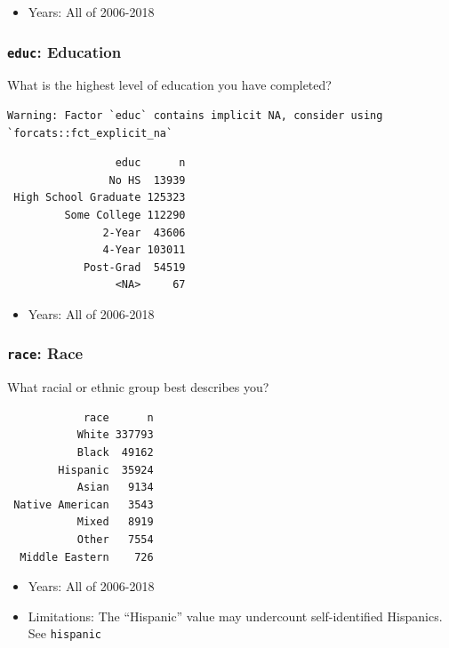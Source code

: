 \documentclass[10pt,article,oneside]{memoir}
\theoremstyle{definition}
\begin{document}
\begin{itemize}
\tightlist
\item
  Years: All of 2006-2018
\end{itemize}

\hypertarget{educ-education}{%
\subsubsection{\texorpdfstring{\texttt{educ}:
Education}{educ: Education}}\label{educ-education}}

What is the highest level of education you have completed?

\begin{verbatim}
Warning: Factor `educ` contains implicit NA, consider using
`forcats::fct_explicit_na`
\end{verbatim}

\begin{verbatim}
                 educ      n
                No HS  13939
 High School Graduate 125323
         Some College 112290
               2-Year  43606
               4-Year 103011
            Post-Grad  54519
                 <NA>     67
\end{verbatim}

\begin{itemize}
\tightlist
\item
  Years: All of 2006-2018
\end{itemize}

\hypertarget{race-race}{%
\subsubsection{\texorpdfstring{\texttt{race}:
Race}{race: Race}}\label{race-race}}

What racial or ethnic group best describes you?

\begin{verbatim}
            race      n
           White 337793
           Black  49162
        Hispanic  35924
           Asian   9134
 Native American   3543
           Mixed   8919
           Other   7554
  Middle Eastern    726
\end{verbatim}

\begin{itemize}
\tightlist
\item
  Years: All of 2006-2018
\item
  Limitations: The ``Hispanic'' value may undercount self-identified
  Hispanics. See \texttt{hispanic}
\end{itemize}
\end{document}
